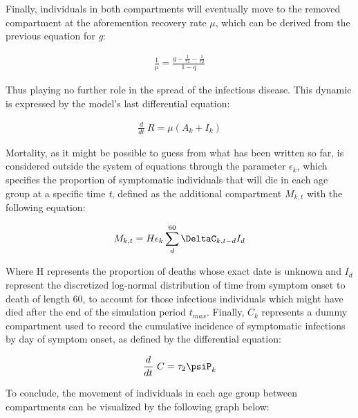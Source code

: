 \documentclass[../main.tex]{subfiles}
\begin{document}
Finally, individuals in both compartments will eventually move to the removed compartment at the aforemention recovery rate $\mu$, which can be derived from the previous equation for \textit{g}:

\begin{align}
\frac{1}{\mu}=\frac{g-\frac{1}{\tau1}-\frac{1}{\tau2}}{1-q}
\end{align}

Thus playing no further role in the spread of the infectious disease. This dynamic is expressed by the model's last differential equation:

\begin{align}
\frac{d}{dt}~R = \mu(A_{k}+I_{k})
\end{align}

Mortality, as it might be possible to guess from what has been written so far, is considered outside the system of equations through the parameter $\epsilon_k$, which specifies the proportion of symptomatic individuals that will die in each age group at a specific time \textit{t}, defined as the additional compartment $M_{k,t}$ with the following equation:

\begin{align}
M_{k,t} = H\epsilon_{k}\sum_{d}^{60}\DeltaC_{k,t-d}I_{d}
\end{align}

Where H represents the proportion of deaths whose exact date is unknown and $I_{d}$ represent the discretized log-normal distribution of time from symptom onset to death of length 60, to account for those infectious individuals which might have died after the end of the simulation period $t_{max}$. Finally, $C_{k}$ represents a dummy compartment used to  record the cumulative incidence of symptomatic infections by day of symptom onset, as defined by the differential equation:

\begin{align}
\frac{d}{dt}~C=\tau_{2}\psiP_{k}
\end{align}

To conclude, the movement of individuals in each age group between compartments can be visualized by the following graph below: 

\end{document}
